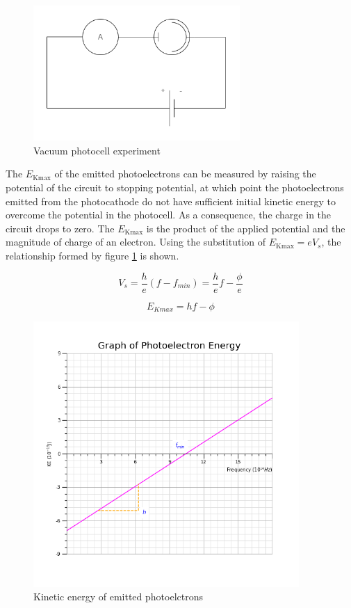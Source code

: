 \documentclass[12pt]{article}
\begin{document}
\begin{figure}[H]
\centering
\includegraphics[width=0.7\textwidth,keepaspectratio]{./images/photoelectric_effect_circuit.png}
\caption{Vacuum photocell experiment}
\end{figure}

The \(E_{\text{Kmax}}\) of the emitted photoelectrons can be measured by raising the potential of the circuit to stopping potential, at which point the photoelectrons emitted from the photocathode do not have sufficient initial kinetic energy to overcome the potential in the photocell. As a consequence, the charge in the circuit drops to zero. The \(E_{\text{Kmax}}\) is the product of the applied potential and the magnitude of charge of an electron. Using the substitution of \(E_{\text{Kmax}} = eV_s\), the relationship formed by figure \ref{img:photoelectric_graph} is shown.

\[V_s = \dfrac{h}{e}(f - f_{min}) = \dfrac{h}{e}f - \dfrac{\phi}{e}\]

\[E_{Kmax} = hf - \phi\]

\begin{figure}[H]
\centering
\includegraphics[width=0.9\textwidth,keepaspectratio]{./images/photoelectron_energy.png}
\caption{Kinetic energy of emitted photoelctrons}
\label{img:photoelectric_graph}
\end{figure}
\end{document}
